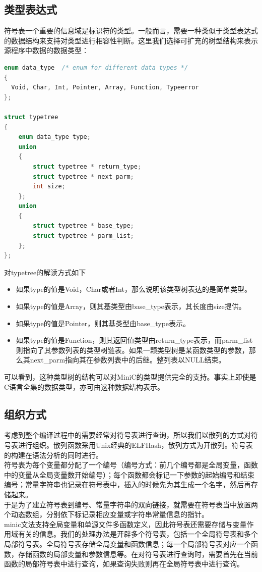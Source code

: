\documentclass[12pt,a4paper,Flow]{report}
\begin{document}
\subsection{类型表达式}
符号表一个重要的信息域是标识符的类型。一般而言，需要一种类似于类型表达式的数据结构来支持对类型进行相容性判断。这里我们选择可扩充的树型结构来表示源程序中数据的数据类型：
\begin{lstlisting}[language=c]
enum data_type	/* enum for different data types */
{
  Void, Char, Int, Pointer, Array, Function, Typeerror
};

struct typetree
{
	enum data_type type;
	union
	{
		struct typetree * return_type;
		struct typetree * next_parm;
		int size;
	};
	union
	{
	    struct typetree * base_type;
	    struct typetree * parm_list;
	};
};
\end{lstlisting}
对typetree的解读方式如下
\begin{itemize}
\item 如果type的值是Void，Char或者Int，那么说明该类型树表达的是简单类型。
\item 如果type的值是Array，则其基类型由base\_type表示，其长度由size提供。
\item 如果type的值是Pointer，则其基类型由base\_type表示。
\item 如果type的值是Function，则其返回值类型由return\_type表示，而parm\_list则指向了其参数列表的类型树链表。如果一颗类型树是某函数类型的参数，那么其next\_parm指向其在参数列表中的后继。整列表以NULL结束。
\end{itemize}
可以看到，这种类型树的结构可以对MiniC的类型提供完全的支持。事实上即使是C语言全集的数据类型，亦可由这种数据结构表示。
\subsection{组织方式}
考虑到整个编译过程中的需要经常对符号表进行查询，所以我们以散列的方式对符号表进行组织。散列函数采用Unix经典的ELFHash，散列方式为开散列。符号表的构建在语法分析的同时进行。\\
\indent 符号表为每个变量都分配了一个编号（编号方式：前几个编号都是全局变量，函数中的变量从全局变量数开始编号）；每个函数都会标记一下参数的起始编号和结束编号；常量字符串也记录在符号表中，插入的时候先为其生成一个名字，然后再存储起来。\\
\indent 于是为了建立符号表到编号、常量字符串的双向链接，就需要在符号表当中放置两个动态数组，分别依下标记录相应变量或字符串常量信息的指针。\\
\indent minic文法支持全局变量和单源文件多函数定义，因此符号表还需要存储与变量作用域有关的信息。我们的处理办法是开辟多个符号表，包括一个全局符号表和多个局部符号表。全局符号表存储全局变量和函数信息；每一个局部符号表对应一个函数，存储函数的局部变量和参数信息等。在对符号表进行查询时，需要首先在当前函数的局部符号表中进行查询，如果查询失败则再在全局符号表中进行查询。
\end{document}
